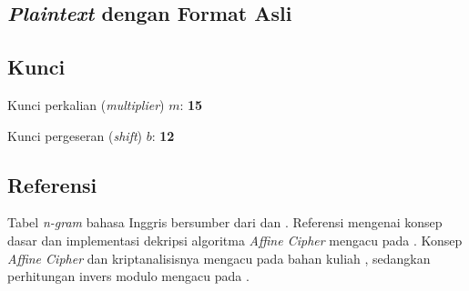 \subsection*{\textit{Plaintext} dengan Format Asli}



\subsection*{Kunci}

Kunci perkalian (\textit{multiplier}) $m$: \textbf{15}

Kunci pergeseran (\textit{shift}) $b$: \textbf{12}

\subsection*{Referensi}

Tabel \textit{n-gram} bahasa Inggris bersumber dari \cite{case-ngram} dan \cite{quadgram-data}. Referensi mengenai konsep dasar dan implementasi dekripsi algoritma \textit{Affine Cipher} mengacu pada \cite{affine-gfg}. Konsep \textit{Affine Cipher} dan kriptanalisisnya mengacu pada bahan kuliah \cite{munir-klasik2}, sedangkan perhitungan invers modulo mengacu pada \cite{munir-matematika}.
